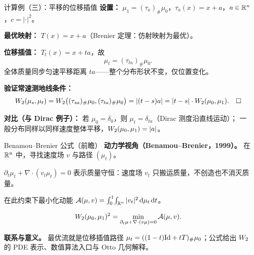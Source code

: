 \begin{frame}{计算例（三）：平移的位移插值}
  \textbf{设置：} $\mu_{1}=(\tau_{a})_{\#}\mu_{0}$，$\tau_{a}(x)=x+a$，$a\in\mathbb{R}^{n}$，$c=|\cdot|^{2}$。

  \textbf{最优映射：} $T(x)=x+a$（Brenier 定理：仿射映射为最优）。

  \textbf{位移插值：} $T_{t}(x)=x+ta$，故
  \[
    \mu_{t}=(\tau_{ta})_{\#}\mu_{0}.
  \]
  全体质量同步匀速平移距离 $ta$——整个分布形状不变，仅位置变化。

  \textbf{验证常速测地线条件：}
  \[
    W_{2}(\mu_{s},\mu_{t})
    =W_{2}\bigl((\tau_{sa})_{\#}\mu_{0},(\tau_{ta})_{\#}\mu_{0}\bigr)
    =|(t-s)a|
    =|t-s|\cdot W_{2}(\mu_{0},\mu_{1}).\quad\square
  \]

  \textbf{对比（与 Dirac 例子）：} 若 $\mu_{0}=\delta_{0}$，则 $\mu_{t}=\delta_{ta}$（Dirac 测度沿直线运动）；
  一般分布同样以同样速度整体平移，$W_{2}(\mu_{0},\mu_{1})=|a|$。

\end{frame}

\begin{frame}{Benamou–Brenier 公式（前瞻）}
  \textbf{动力学视角（Benamou–Brenier，1999）。} 在 $\mathbb{R}^{n}$ 中，寻找速度场 $v$ 与路径 $(\mu_{t})$。

  $\partial_{t}\mu_{t}+\nabla\cdot(v_{t}\mu_{t})=0$ 表示质量守恒：速度场 $v_{t}$ 只搬运质量，不创造也不消灭质量。

  在此约束下最小化动能
  $\mathcal{A}(\mu,v)=\int_{0}^{1}\!\int_{\mathbb{R}^{n}}|v_{t}|^{2}\,\mathrm{d}\mu_{t}\,\mathrm{d} t$。

  \[
    W_{2}(\mu_{0},\mu_{1})^{2}
    =\min_{\partial_{t}\mu+\nabla\cdot(v\mu)=0}\mathcal{A}(\mu,v).
  \]

  \textbf{联系与意义。} 最优流就是位移插值路径
  $\mu_{t}=((1-t)\mathrm{Id}+tT)_{\#}\mu_{0}$；公式给出 $W_{2}$ 的 PDE 表示、数值算法入口与 Otto 几何解释。

\end{frame}

